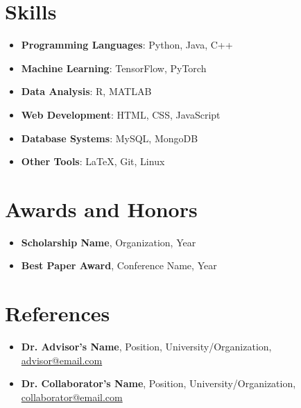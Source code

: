 \documentclass[letterpaper,10pt]{article}
\begin{document}

\section*{Skills}

\begin{itemize}[leftmargin=*]
    \item \textbf{Programming Languages}: Python, Java, C++
    \item \textbf{Machine Learning}: TensorFlow, PyTorch
    \item \textbf{Data Analysis}: R, MATLAB
    \item \textbf{Web Development}: HTML, CSS, JavaScript
    \item \textbf{Database Systems}: MySQL, MongoDB
    \item \textbf{Other Tools}: LaTeX, Git, Linux
\end{itemize}


\section*{Awards and Honors}

\begin{itemize}[leftmargin=*]
    \item \textbf{Scholarship Name}, Organization, Year
    \item \textbf{Best Paper Award}, Conference Name, Year
\end{itemize}


\section*{References}

\begin{itemize}[leftmargin=*]
    \item \textbf{Dr. Advisor's Name}, Position, University/Organization, \href{mailto:advisor@email.com}{advisor@email.com}
    \item \textbf{Dr. Collaborator's Name}, Position, University/Organization, \href{mailto:collaborator@email.com}{collaborator@email.com}
\end{itemize}

\end{document}
